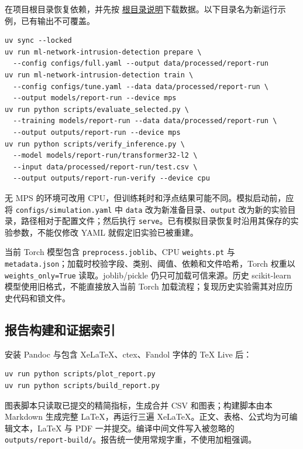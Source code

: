 \documentclass[UTF8,a4paper,11pt,fontset=fandol]{ctexart}
\begin{document}
在项目根目录恢复依赖，并先按
\href{https://github.com/ZureTz/ml-network-intrusion-detection/blob/master/README.md}{根目录说明}下载数据。以下目录名为新运行示例，已有输出不可覆盖。

\begin{verbatim}
uv sync --locked
uv run ml-network-intrusion-detection prepare \
  --config configs/full.yaml --output data/processed/report-run
uv run ml-network-intrusion-detection train \
  --config configs/tune.yaml --data data/processed/report-run \
  --output models/report-run --device mps
uv run python scripts/evaluate_selected.py \
  --training models/report-run --data data/processed/report-run \
  --output outputs/report-run --device mps
uv run python scripts/verify_inference.py \
  --model models/report-run/transformer32-l2 \
  --input data/processed/report-run/test.csv \
  --output outputs/report-run-verify --device cpu
\end{verbatim}

无 MPS 的环境可改用 CPU，但训练耗时和浮点结果可能不同。模拟启动前，应将
\texttt{configs/simulation.yaml} 中 \texttt{data}
改为新准备目录、\texttt{output}
改为新的实验目录，路径相对于配置文件；然后执行
\texttt{serve}。已有模拟目录恢复时沿用其保存的实验参数，不能仅修改 YAML
就假定旧实验已被重建。

当前 Torch 模型包含 \texttt{preprocess.joblib}、CPU \texttt{weights.pt}
与
\texttt{metadata.json}；加载时校验字段、类别、阈值、依赖和文件哈希，Torch
权重以 \texttt{weights\_only=True} 读取。joblib/pickle
仍只可加载可信来源。历史 scikit-learn 模型使用旧格式，不能直接放入当前
Torch 加载流程；复现历史实验需其对应历史代码和锁文件。

\subsection{报告构建和证据索引}\label{ux62a5ux544aux6784ux5efaux548cux8bc1ux636eux7d22ux5f15}

安装 Pandoc 与包含 XeLaTeX、ctex、Fandol 字体的 TeX Live 后：

\begin{verbatim}
uv run python scripts/plot_report.py
uv run python scripts/build_report.py
\end{verbatim}

图表脚本只读取已提交的精简指标，生成合并 CSV 和图表；构建脚本由本
Markdown 生成完整 LaTeX，再运行三遍
XeLaTeX。正文、表格、公式均为可编辑文本，LaTeX 与 PDF
一并提交。编译中间文件写入被忽略的
\texttt{outputs/report-build/}。报告统一使用常规字重，不使用加粗强调。
\end{document}
